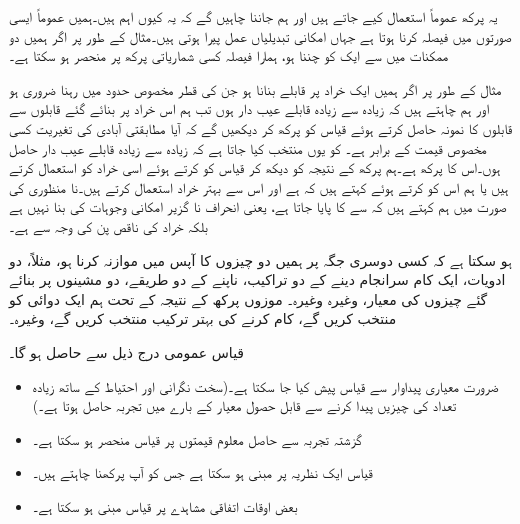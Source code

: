 یہ پرکھ عموماً استعمال کیے جاتے ہیں اور ہم جاننا چاہیں گے کہ یہ کیوں اہم ہیں۔ہمیں عموماً ایسی صورتوں میں فیصلہ کرنا ہوتا ہے جہاں امکانی تبدیلیاں عمل پیرا ہوتی ہیں۔مثال کے طور پر اگر ہمیں دو ممکنات میں سے ایک کو چننا ہو، ہمارا فیصلہ کسی شماریاتی پرکھ پر منحصر ہو سکتا ہے۔

مثال کے طور پر اگر ہمیں ایک خراد پر قابلے بنانا ہو جن کی قطر مخصوص حدود میں رہنا ضروری ہو اور ہم چاہتے ہیں کہ زیادہ سے زیادہ  قابلے عیب دار ہوں تب ہم اس خراد پر بنائے گئے قابلوں سے  قابلوں کا نمونہ حاصل کرتے ہوئے قیاس  کو پرکھ کر دیکھیں گے کہ آیا مطابقتی آبادی کی تغیریت  کسی مخصوص قیمت  کے برابر ہے۔ کو یوں منتخب کیا جاتا ہے کہ زیادہ سے زیادہ   قابلے عیب دار حاصل ہوں۔اس کا  پرکھ  ہے۔ہم پرکھ کے نتیجہ کو دیکھ کر قیاس  کو  کرتے ہوئے اسی خراد کو استعمال کرتے ہیں یا ہم اس کو  کرتے ہوئے کہتے ہیں کہ  ہے اور اس سے بہتر خراد استعمال کرتے ہیں۔نا منظوری کی صورت میں ہم کہتے ہیں کہ  سے  کا  پایا جاتا ہے، یعنی انحراف نا گزیر  امکانی وجوہات کی بنا نہیں ہے بلکہ خراد کی ناقص پن کی وجہ سے ہے۔

ہو سکتا ہے کہ کسی دوسری جگہ پر ہمیں دو چیزوں کا آپس میں موازنہ کرنا ہو، مثلاً، دو ادویات، ایک کام سرانجام دینے کے دو تراکیب، ناپنے کے دو طریقے، دو مشینوں پر بنائے گئے چیزوں کی معیار، وغیرہ وغیرہ۔ موزوں پرکھ کے نتیجہ کے تحت ہم ایک دوائی کو منتخب کریں گے، کام کرنے کی بہتر ترکیب منتخب کریں گے، وغیرہ۔

قیاس عمومی درج ذیل سے حاصل ہو گا۔
\begin{itemize}
\item
ضرورت معیاری پیداوار سے قیاس پیش کیا جا سکتا ہے۔(سخت نگرانی اور احتیاط کے ساتھ زیادہ تعداد کی چیزیں پیدا کرنے سے قابل حصول معیار کے بارے میں تجربہ حاصل ہوتا ہے۔)\\
\item
گزشتہ تجربہ سے حاصل معلوم قیمتوں پر قیاس منحصر ہو سکتا ہے۔\\
\item
قیاس ایک نظریہ پر مبنی ہو سکتا ہے جس کو آپ پرکھنا چاہتے ہیں۔\\
\item
بعض اوقات اتفاقی مشاہدے پر قیاس مبنی ہو سکتا ہے۔   
\end{itemize}  

